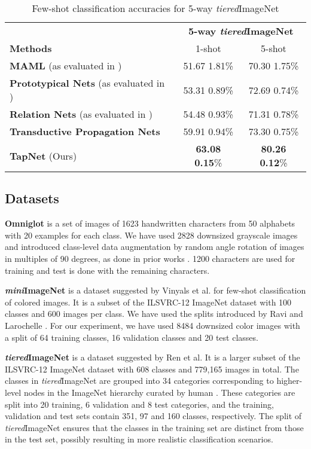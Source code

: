 \documentclass{article}
\begin{document}
\begin{table*}[h]
  \caption{Few-shot classification accuracies for 5-way \textit{tiered}ImageNet}
  \label{acc_table2}
  \centering
  \begin{tabular}{l||cc}
    \toprule  
    &  \multicolumn{2}{c}{\textbf{5-way \textit{tiered}ImageNet}} \\
    \cmidrule{2-3}
    \textbf{Methods} 	& 1-shot & 5-shot  \\
    \midrule
    \textbf{MAML} (as evaluated in \cite{Liu})  & 51.67  1.81\%  & 70.30  1.75\%   \\
    \textbf{Prototypical Nets} (as evaluated in \cite{Liu}) & 53.31  0.89\%  & 72.69  0.74\%	 \\
    \textbf{Relation Nets} (as evaluated in \cite{Liu}) & 54.48  0.93\%  & 71.31  0.78\%	  \\
    \textbf{Transductive Propagation Nets} \cite{Liu}  & 59.91  0.94\%  & 73.30  0.75\%  \\
    \textbf{TapNet} (Ours)   &\textbf{63.08}  \textbf{0.15}\%  & \textbf{80.26}  \textbf{0.12}\%\\
    \bottomrule
  \end{tabular}
\end{table*}

\subsection{Datasets}
\textbf{Omniglot} \cite{Omniglot} is a set of images of 1623 handwritten characters from 50 alphabets with 20 examples for each class. We have used 2828 downsized grayscale images and introduced class-level data augmentation by random angle rotation of images in multiples of 90 degrees, as done in prior works \cite{MANN,PN,MN}. 1200 characters are used for training and test is done with the remaining characters.

\textbf{\textit{mini}ImageNet} \cite{MN} is a dataset suggested by Vinyals et al. for few-shot classification of colored images. It is a subset of the ILSVRC-12 ImageNet dataset \cite{Imagenet} with 100 classes and 600 images per class. We have used the splits introduced by Ravi and Larochelle \cite{Ravi}. For our experiment, we have used 8484 downsized color images with a split of 64 training classes, 16 validation classes and 20 test classes.

\textbf{\textit{tiered}ImageNet} \cite{MRen} is a dataset suggested by Ren et al. It is a larger subset of the ILSVRC-12 ImageNet dataset with 608 classes and 779,165 images in total. The classes in \textit{tiered}ImageNet are grouped into 34 categories corresponding to higher-level nodes in the ImageNet hierarchy curated by human \cite{Deng}. These categories are split into 20 training, 6 validation and 8 test categories, and the training, validation and test sets contain 351, 97 and 160 classes, respectively. The split of \textit{tiered}ImageNet ensures that the classes in the training set are distinct from those in the test set, possibly resulting in more realistic classification scenarios.
\end{document}
